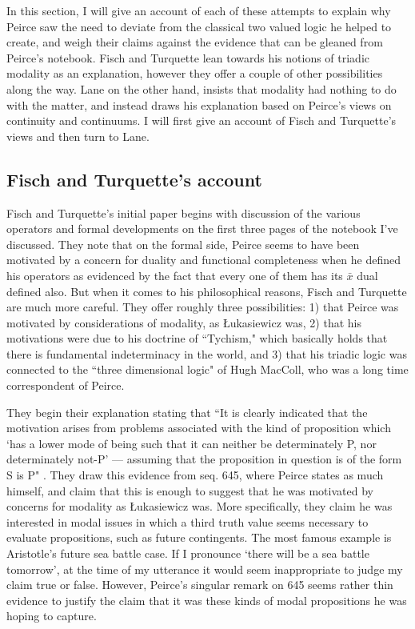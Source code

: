 \documentclass[12pt]{article}
\begin{document}
In this section, I will give an account of each of these attempts to explain why Peirce saw the need to deviate from the classical two valued logic he helped to create, and weigh their claims against the evidence that can be gleaned from Peirce's notebook. Fisch and Turquette lean towards his notions of triadic modality as an explanation, however they offer a couple of other possibilities along the way. Lane on the other hand, insists that modality had nothing to do with the matter, and instead draws his explanation based on Peirce's views on continuity and continuums. I will first give an account of Fisch and Turquette's views and then turn to Lane.

\subsection{Fisch and Turquette's account}

Fisch and Turquette's initial paper begins with discussion of the various operators and formal developments on the first three pages of the notebook I've discussed. They note that on the formal side, Peirce seems to have been motivated by a concern for duality and functional completeness when he defined his operators as evidenced by the fact that every one of them has its $\bar{x}$ dual defined also. But when it comes to his philosophical reasons, Fisch and Turquette are much more careful. They offer roughly three possibilities: 1) that Peirce was motivated by considerations of modality, as Łukasiewicz was, 2) that his motivations were due to his doctrine of ``Tychism," which basically holds that there is fundamental indeterminacy in the world, and 3) that his triadic logic was connected to the ``three dimensional logic" of Hugh MacColl, who was a long time correspondent of Peirce.

They begin their explanation stating that ``It is clearly indicated that the motivation arises from problems associated with the kind of proposition which `has a lower mode of being such that it can neither be determinately P, nor determinately not-P' --- assuming that the proposition in question is of the form S is P" \citep{fisch1966peirce}. They draw this evidence from seq. 645, where Peirce states as much himself, and claim that this is enough to suggest that he was motivated by concerns for modality as Łukasiewicz was. More specifically, they claim he was interested in modal issues in which a third truth value seems necessary to evaluate propositions, such as future contingents. The most famous example is Aristotle's future sea battle case. If I pronounce `there will be a sea battle tomorrow', at the time of my utterance it would seem inappropriate to judge my claim true or false. However, Peirce's singular remark on 645 seems rather thin evidence to justify the claim that it was these kinds of modal propositions he was hoping to capture.
\end{document}
